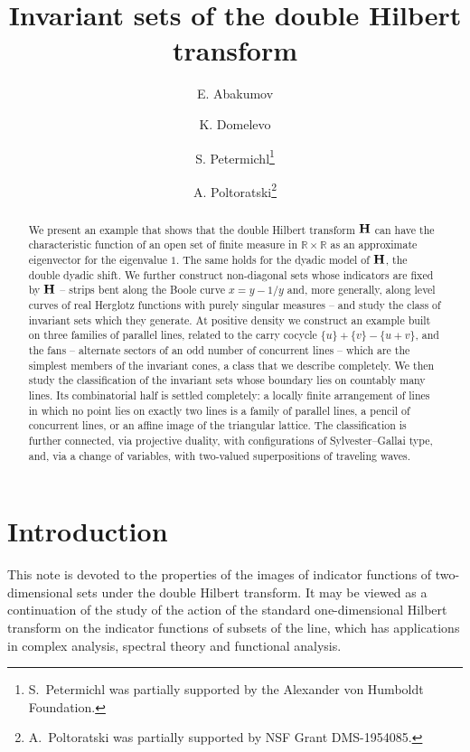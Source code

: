 \documentclass{article}
\def\H{{\bf H}}
\begin{document}
	\title{Invariant sets of the double Hilbert transform}
	\author{E. Abakumov \and K. Domelevo \and
		S. Petermichl\thanks{S.~Petermichl was partially supported by the Alexander von Humboldt Foundation.}
		\and A. Poltoratski\thanks{A.~Poltoratski was partially supported by NSF Grant DMS-1954085.}}
	\date{}


	\maketitle

	\begin{abstract}
		We present an example that shows that the double Hilbert transform
		$\H$ can have the characteristic function of an open set of finite measure in $\mathbb{R}
		\times \mathbb{R}$ as an approximate eigenvector for the eigenvalue $1$. The
		same holds for the dyadic model of $\H$, the double dyadic shift. We further construct
		non-diagonal sets whose indicators are fixed by $\H$ -- strips bent along
		the Boole curve $x=y-1/y$ and, more generally, along level curves of real
		Herglotz functions with purely singular measures -- and study the class of
		invariant sets which they generate. At positive density we construct an
		example built on three families of parallel lines, related to the carry
		cocycle $\{u\}+\{v\}-\{u+v\}$, and the fans -- alternate sectors of an odd number of concurrent lines -- which are the simplest members of the invariant cones, a class that we describe completely. We then study the classification of the invariant sets whose
		boundary lies on countably many lines. Its combinatorial half is settled
		completely: a locally finite arrangement of lines in which no point lies
		on exactly two lines is a family of parallel lines, a pencil of
		concurrent lines, or an affine image of the triangular lattice. The
		classification is further connected, via projective duality, with
		configurations of Sylvester--Gallai type, and, via a change of
		variables, with two-valued superpositions of traveling waves.
	\end{abstract}

	\section{Introduction}

	This note is devoted to the properties of the images of indicator functions of two-dimensional sets under the double Hilbert transform. It may be viewed as a continuation of the study of the action of the standard one-dimensional Hilbert transform on the indicator functions of subsets of the line, which has applications in complex analysis, spectral theory and functional analysis.
\end{document}
